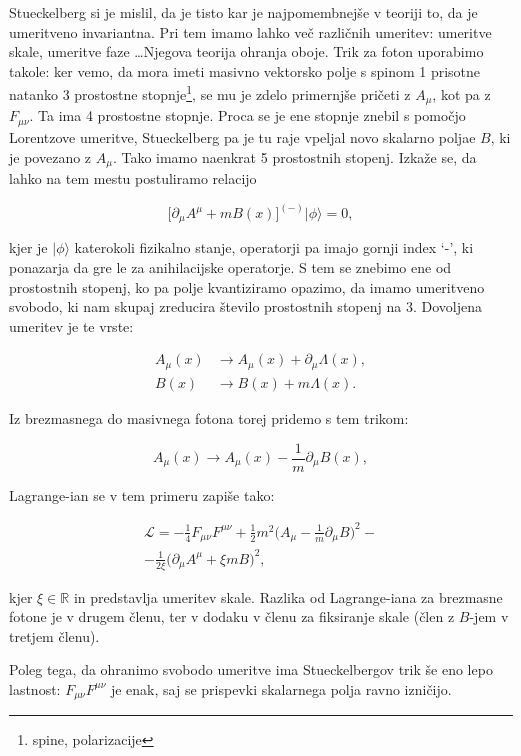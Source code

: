 \documentclass[a4paper, twocolumn, titlepage]{article}
\begin{document}
Stueckelberg si je mislil, da je tisto kar je najpomembnej\v se v teoriji to, da je umeritveno invariantna. Pri tem imamo
lahko ve\v c razli\v cnih umeritev: umeritve skale, umeritve faze \ldots Njegova teorija ohranja oboje. Trik za foton
uporabimo takole: ker vemo, da mora imeti masivno vektorsko polje s spinom 1 prisotne natanko 3 prostostne
stopnje\footnote{spine, polarizacije}, se mu je zdelo primernj\v se pri\v ceti z $A_\mu$, kot pa z $F_{\mu\nu}$. Ta ima
4 prostostne stopnje. Proca se je ene stopnje znebil s pomo\v cjo Lorentzove umeritve, Stueckelberg pa je tu raje vpeljal
novo skalarno poljae $B$, ki je povezano z $A_\mu$. Tako imamo naenkrat 5 prostostnih stopenj. Izka\v ze se, da lahko na
tem mestu postuliramo relacijo

\[
	\big[\partial_\mu A^\mu + mB(x)\big]^{(-)}|\phi\rangle = 0,
\]

kjer je $|\phi\rangle$ katerokoli fizikalno stanje, operatorji pa imajo gornji index `-', ki ponazarja da gre le za
anihilacijske operatorje. S tem se znebimo ene od prostostnih stopenj, ko pa polje kvantiziramo opazimo, da imamo
umeritveno svobodo, ki nam skupaj zreducira \v stevilo prostostnih stopenj na 3. Dovoljena umeritev je te vrste:

\begin{align*}
	A_\mu (x) &\to A_\mu (x) + \partial_\mu \Lambda (x), \\
	B (x) &\to B (x) + m\Lambda(x).
\end{align*}

Iz brezmasnega do masivnega fotona torej pridemo s tem trikom:

\begin{equation}
	A_\mu (x) \to A_\mu (x) - \frac{1}{m}\partial_\mu B(x),
\end{equation}

Lagrange-ian se v tem primeru zapi\v se tako:

\begin{multline}
	\mathcal{L} = -\frac{1}{4}F_{\mu\nu}F^{\mu\nu} + \frac{1}{2}m^2\Big(A_\mu - \frac{1}{m}\partial_\mu B\Big)^2 -\\-
		\frac{1}{2\xi}\big(\partial_\mu A^\mu + \xi mB\big)^2,
\end{multline}

kjer $\xi \in \mathbb{R}$ in predstavlja umeritev skale. Razlika od Lagrange-iana za brezmasne fotone je v drugem \v clenu,
ter v dodaku v \v clenu za fiksiranje skale (\v clen z $B$-jem v tretjem \v clenu).

Poleg tega, da ohranimo svobodo umeritve ima Stueckelbergov trik \v se eno lepo lastnost: $F_{\mu\nu} F^{\mu\nu}$ je enak,
saj se prispevki skalarnega polja ravno izni\v cijo.
\end{document}
